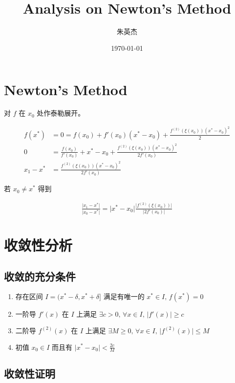 \documentclass[12pt,a4paper]{ctexart}
\title{Analysis on Newton's Method}
\author{朱英杰}
\date{\today}
\begin{document}
\maketitle

\section{Newton's Method}

对 $f$ 在 $x_0$ 处作泰勒展开。

\begin{align*}
f(x^*) &= 0 = f(x_0) + f'(x_0)(x^* - x_0) + \frac{f^{(2)}(\xi(x_0))(x^* - x_0)^2}{2} \\
0 &= \frac{f(x_0)}{f'(x_0)} + x^* - x_0 + \frac{f^{(2)}(\xi(x_0))(x^* - x_0)^2}{2f'(x_0)} \\
x_{1} - x^*&= \frac{f^{(2)}(\xi(x_0))(x^* - x_0)^2}{2f'(x_0)}
\end{align*}

若 $x_0 \ne x^*$ 得到

\begin{align*}
\frac{\lvert x_1 - x^* \rvert }{\lvert x_0 - x^* \rvert}  = \lvert x^* - x_0 \rvert \frac{\lvert f^{(2)}(\xi(x_0)) \rvert}{ \lvert 2f'(x_0) \rvert}
\end{align*}


\section{收敛性分析}

\subsection{收敛的充分条件}

\begin{enumerate}
    \item 存在区间 $I = (x^* - \delta, x^* + \delta]$ 满足有唯一的 $ x^* \in I,\, f(x^*) = 0$
    \item 一阶导 $f'(x)$ 在 $I$ 上满足 $\exists c > 0,\, \forall x \in I,\, \lvert f'(x) \rvert \ge c$
    \item 二阶导 $f^{(2)}(x)$ 在 $I$ 上满足 $\exists M \ge 0,\, \forall x \in I,\, \lvert f^{(2)}(x) \rvert \le M$
    \item 初值 $x_0 \in I$ 而且有 $\lvert x^* - x_0 \rvert < \frac{2c}{M}$
\end{enumerate}


\subsection{收敛性证明}
\end{document}
